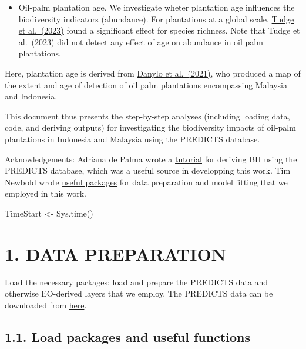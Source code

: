 \documentclass[
  letterpaper,
  DIV=11,
  numbers=noendperiod]{scrartcl}
\newenvironment{Shaded}{\begin{snugshade}}{\end{snugshade}}
\newcommand{\FunctionTok}[1]{\textcolor[rgb]{0.28,0.35,0.67}{#1}}
\newcommand{\NormalTok}[1]{\textcolor[rgb]{0.00,0.23,0.31}{#1}}
\newcommand{\OtherTok}[1]{\textcolor[rgb]{0.00,0.23,0.31}{#1}}
\providecommand{\tightlist}{%
  \setlength{\itemsep}{0pt}\setlength{\parskip}{0pt}}\usepackage{longtable,booktabs,array}
\begin{document}
\begin{itemize}
\tightlist
\item
  Oil-palm plantation age. We investigate wheter plantation age
  influences the biodiversity indicators (abundance). For plantations at
  a global scale,
  \href{https://www.sciencedirect.com/science/article/pii/S2351989423003864}{Tudge
  et al.~(2023)} found a significant effect for species richness. Note
  that Tudge et al.~(2023) did not detect any effect of age on abundance
  in oil palm plantations.
\end{itemize}

Here, plantation age is derived from
\href{https://www.nature.com/articles/s41597-021-00867-1}{Danylo et
al.~(2021)}, who produced a map of the extent and age of detection of
oil palm plantations encompassing Malaysia and Indonesia.

This document thus presents the step-by-step analyses (including loading
data, code, and deriving outputs) for investigating the biodiversity
impacts of oil-palm plantations in Indonesia and Malaysia using the
PREDICTS database.

Acknowledgements: Adriana de Palma wrote a
\href{https://adrianadepalma.github.io/BII_tutorial/\#Run_the_statistical_analysis}{tutorial}
for deriving BII using the PREDICTS database, which was a useful source
in developping this work. Tim Newbold wrote
\href{https://github.com/timnewbold/StatisticalModels}{useful packages}
for data preparation and model fitting that we employed in this work.

\begin{Shaded}
\begin{Highlighting}[]
\NormalTok{TimeStart }\OtherTok{\textless{}{-}} \FunctionTok{Sys.time}\NormalTok{()}
\end{Highlighting}
\end{Shaded}

\hypertarget{data-preparation}{%
\section{1. DATA PREPARATION}\label{data-preparation}}

Load the necessary packages; load and prepare the PREDICTS data and
otherwise EO-derived layers that we employ. The PREDICTS data can be
downloaded from
\href{https://data.nhm.ac.uk/dataset/?tags=predicts}{here}.

\hypertarget{load-packages-and-useful-functions}{%
\subsection{1.1. Load packages and useful
functions}\label{load-packages-and-useful-functions}}
\end{document}
